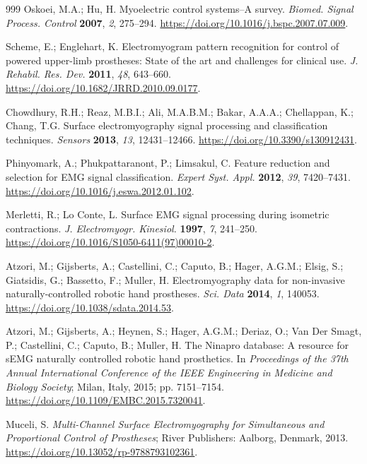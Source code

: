 \documentclass[technologies,article,submit,pdftex,moreauthors]{Definitions/mdpi}
\begin{document}
\begin{thebibliography}{999}
Oskoei, M.A.; Hu, H. Myoelectric control systems--A survey. \textit{Biomed. Signal Process. Control} \textbf{2007}, \textit{2}, 275--294. \url{https://doi.org/10.1016/j.bspc.2007.07.009}.

Scheme, E.; Englehart, K. Electromyogram pattern recognition for control of powered upper-limb prostheses: State of the art and challenges for clinical use. \textit{J. Rehabil. Res. Dev.} \textbf{2011}, \textit{48}, 643--660. \url{https://doi.org/10.1682/JRRD.2010.09.0177}.

Chowdhury, R.H.; Reaz, M.B.I.; Ali, M.A.B.M.; Bakar, A.A.A.; Chellappan, K.; Chang, T.G. Surface electromyography signal processing and classification techniques. \textit{Sensors} \textbf{2013}, \textit{13}, 12431--12466. \url{https://doi.org/10.3390/s130912431}.

Phinyomark, A.; Phukpattaranont, P.; Limsakul, C. Feature reduction and selection for EMG signal classification. \textit{Expert Syst. Appl.} \textbf{2012}, \textit{39}, 7420--7431. \url{https://doi.org/10.1016/j.eswa.2012.01.102}.

Merletti, R.; Lo Conte, L. Surface EMG signal processing during isometric contractions. \textit{J. Electromyogr. Kinesiol.} \textbf{1997}, \textit{7}, 241--250. \url{https://doi.org/10.1016/S1050-6411(97)00010-2}.

Atzori, M.; Gijsberts, A.; Castellini, C.; Caputo, B.; Hager, A.G.M.; Elsig, S.; Giatsidis, G.; Bassetto, F.; Muller, H. Electromyography data for non-invasive naturally-controlled robotic hand prostheses. \textit{Sci. Data} \textbf{2014}, \textit{1}, 140053. \url{https://doi.org/10.1038/sdata.2014.53}.

Atzori, M.; Gijsberts, A.; Heynen, S.; Hager, A.G.M.; Deriaz, O.; Van Der Smagt, P.; Castellini, C.; Caputo, B.; Muller, H. The Ninapro database: A resource for sEMG naturally controlled robotic hand prosthetics. In \textit{Proceedings of the 37th Annual International Conference of the IEEE Engineering in Medicine and Biology Society}; Milan, Italy, 2015; pp. 7151--7154. \url{https://doi.org/10.1109/EMBC.2015.7320041}.

Muceli, S. \textit{Multi-Channel Surface Electromyography for Simultaneous and Proportional Control of Prostheses}; River Publishers: Aalborg, Denmark, 2013. \url{https://doi.org/10.13052/rp-9788793102361}.


\end{thebibliography}
\end{document}
